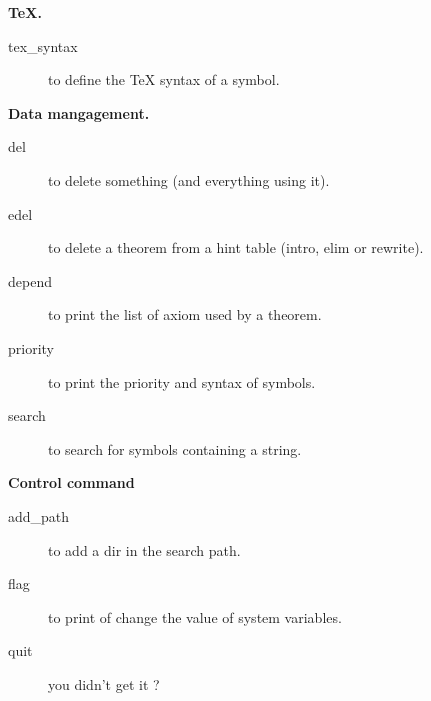 \documentclass[long]{slides}
\begin{document}
\begin{slide}{\bf TeX.}
\begin{description}
\item[tex\_syntax] to define the TeX syntax of a symbol.
\end{description}
\end{slide}
 
\begin{slide}{\bf Data mangagement.}
\begin{description}
\item[del] to delete something (and everything using it).
\item[edel] to delete a theorem from a hint table (intro, elim or rewrite).
\item[depend] to print the list of axiom used by a theorem. 
\item[priority] to print the priority and syntax of symbols.
\item[search] to search for symbols containing a string.
\end{description}
\end{slide}

\begin{slide}{\bf Control command}
\begin{description}
\item[add\_path] to add a dir in the search path.
\item[flag] to print of change the value of system variables.
\item[quit] you didn't get it ?
\end{description}
\end{slide}
\end{document}
